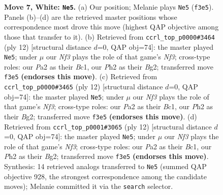 \documentclass[11pt]{article}
\begin{document}
\begin{figure}[p]
\caption{\textbf{Move 7, White: \texttt{Ne5}.} (a) Our position; Melanie plays \texttt{Ne5} (\texttt{f3e5}). Panels (b)--(d) are the retrieved master positions whose correspondence most drove this move (highest QAP objective among those that transfer to it). (b) Retrieved from \texttt{ccrl\_top\_p0000\#3464} (ply 12) [structural distance $d$=0, QAP obj=74]: the master played \texttt{Ne5}; under $\mu$ our \emph{Nf3} plays the role of that game's \emph{Nf3}; cross-type roles: our \emph{P}a2 as their \emph{B}c1, our \emph{P}h2 as their \emph{B}g2; transferred move \texttt{f3e5} \textbf{(endorses this move)}. (c) Retrieved from \texttt{ccrl\_top\_p0000\#3465} (ply 12) [structural distance $d$=0, QAP obj=74]: the master played \texttt{Ne5}; under $\mu$ our \emph{Nf3} plays the role of that game's \emph{Nf3}; cross-type roles: our \emph{P}a2 as their \emph{B}c1, our \emph{P}h2 as their \emph{B}g2; transferred move \texttt{f3e5} \textbf{(endorses this move)}. (d) Retrieved from \texttt{ccrl\_top\_p0001\#3065} (ply 12) [structural distance $d$=0, QAP obj=74]: the master played \texttt{Ne5}; under $\mu$ our \emph{Nf3} plays the role of that game's \emph{Nf3}; cross-type roles: our \emph{P}a2 as their \emph{B}c1, our \emph{P}h2 as their \emph{B}g2; transferred move \texttt{f3e5} \textbf{(endorses this move)}. Synthesis: 14 retrieved analogs transferred to \texttt{Ne5} (summed QAP objective 928, the strongest correspondence among the candidate moves); Melanie committed it via the \texttt{search} selector.}
\label{fig:thought-m12}
\end{figure}

\clearpage
\end{document}
